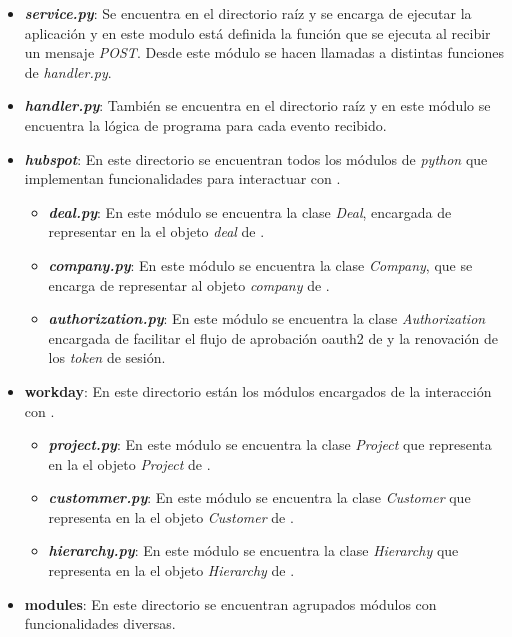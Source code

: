 \begin{itemize}

	\item [\textendash] \textbf{\textit{service.py}}: Se encuentra en el directorio raíz y se encarga de ejecutar la aplicación 
	y en este modulo está definida la función que se ejecuta al recibir un mensaje \textit{POST}. Desde este módulo se hacen llamadas a distintas funciones de \textit{handler.py}.
	\item [\textendash] \textbf{\textit{handler.py}}: También se encuentra en el directorio raíz y en este módulo se encuentra la lógica de programa para cada evento recibido.
	\item[\textendash] \textbf{\textit{hubspot}}: En este directorio se encuentran todos los módulos de \textit{python} que implementan funcionalidades para interactuar con \hs{}.
	
		\begin{itemize}
			\item [\textendash] \textbf{\textit{deal.py}}: En este módulo se encuentra la clase \textit{Deal}, encargada de representar en la \iface{} el objeto \textit{deal} de \hs.
			\item [\textendash] \textbf{\textit{company.py}}: En este módulo se encuentra la clase \textit{Company}, que se encarga de representar al objeto \textit{company} de \hs{}.
			\item [\textendash] \textbf{\textit{authorization.py}}: En este módulo se encuentra la clase \textit{Authorization} encargada de facilitar el flujo de aprobación \gls{oauth2} de \hs{} y la renovación de los \textit{token} de sesión.
		\end{itemize}
		
	\item[\textendash] \textbf{workday}: En este directorio están los módulos encargados de la interacción con \wday{}.
	
		\begin{itemize}
			\item [\textendash] \textbf{\textit{project.py}}: En este módulo se encuentra la clase \textit{Project} que representa en la \iface{} el objeto \textit{Project} de \wday.
			\item [\textendash] \textbf{\textit{custommer.py}}: En este módulo se encuentra la clase \textit{Customer} que representa en la \iface{} el objeto \textit{Customer} de \wday.
			\item [\textendash] \textbf{\textit{hierarchy.py}}: En este módulo se encuentra la clase \textit{Hierarchy} que representa en la \iface{} el objeto \textit{Hierarchy} de \wday.
		\end{itemize}
	\item[\textendash] \textbf{modules}: En este directorio se encuentran agrupados módulos con funcionalidades diversas. 
	

\end{itemize}
